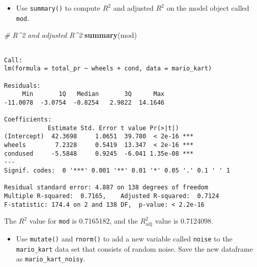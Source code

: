 \documentclass[
]{book}
\newenvironment{Shaded}{\begin{snugshade}}{\end{snugshade}}
\newcommand{\CommentTok}[1]{\textcolor[rgb]{0.56,0.35,0.01}{\textit{#1}}}
\newcommand{\DataTypeTok}[1]{\textcolor[rgb]{0.13,0.29,0.53}{#1}}
\newcommand{\DecValTok}[1]{\textcolor[rgb]{0.00,0.00,0.81}{#1}}
\newcommand{\KeywordTok}[1]{\textcolor[rgb]{0.13,0.29,0.53}{\textbf{#1}}}
\newcommand{\NormalTok}[1]{#1}
\newcommand{\OperatorTok}[1]{\textcolor[rgb]{0.81,0.36,0.00}{\textbf{#1}}}
\newcommand{\StringTok}[1]{\textcolor[rgb]{0.31,0.60,0.02}{#1}}
\providecommand{\tightlist}{%
  \setlength{\itemsep}{0pt}\setlength{\parskip}{0pt}}
\begin{document}
\begin{itemize}
\tightlist
\item
  Use \texttt{summary()} to compute \(R^2\) and adjusted \(R^2\) on the model object called \texttt{mod}.
\end{itemize}

\begin{Shaded}
\begin{Highlighting}[]
\CommentTok{# R^2 and adjusted R^2}
\KeywordTok{summary}\NormalTok{(mod)}
\end{Highlighting}
\end{Shaded}

\begin{verbatim}

Call:
lm(formula = total_pr ~ wheels + cond, data = mario_kart)

Residuals:
     Min       1Q   Median       3Q      Max 
-11.0078  -3.0754  -0.8254   2.9822  14.1646 

Coefficients:
            Estimate Std. Error t value Pr(>|t|)    
(Intercept)  42.3698     1.0651  39.780  < 2e-16 ***
wheels        7.2328     0.5419  13.347  < 2e-16 ***
condused     -5.5848     0.9245  -6.041 1.35e-08 ***
---
Signif. codes:  0 '***' 0.001 '**' 0.01 '*' 0.05 '.' 0.1 ' ' 1

Residual standard error: 4.887 on 138 degrees of freedom
Multiple R-squared:  0.7165,    Adjusted R-squared:  0.7124 
F-statistic: 174.4 on 2 and 138 DF,  p-value: < 2.2e-16
\end{verbatim}

The \(R^2\) value for \texttt{mod} is 0.7165182, and the \(R^2_{\text{adj}}\) value is 0.7124098.

\begin{itemize}
\tightlist
\item
  Use \texttt{mutate()} and \texttt{rnorm()} to add a new variable called \texttt{noise} to the \texttt{mario\_kart} data set that consists of random noise. Save the new dataframe as \texttt{mario\_kart\_noisy}.
\end{itemize}

\begin{Shaded}
\end{Shaded}
\end{document}
